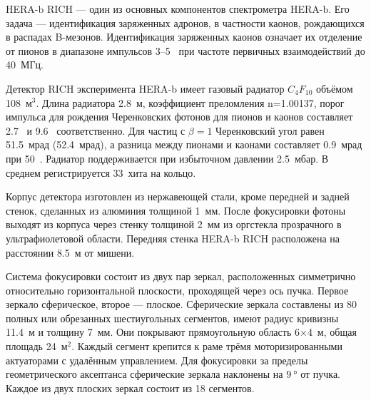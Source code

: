 HERA-b RICH --- один из основных компонентов спектрометра HERA-b. Его задача --- идентификация заряженных адронов, в частности каонов, рождающихся в распадах B-мезонов. Идентификация заряженных каонов означает их отделение от пионов в диапазоне импульсов 3--5~\GeVoverC{} при частоте первичных взаимодействий до 40~МГц.


Детектор RICH эксперимента HERA-b имеет газовый радиатор $C_{4}F_{10}$ объёмом 108~м$^3$. Длина радиатора 2.8~м, коэффициент преломления n=1.00137, порог импульса для рождения Черенковских фотонов для пионов и каонов составляет 2.7~\GeVoverC{} и 9.6~\GeVoverC{} соответственно. Для частиц с $\beta=1$ Черенковский угол равен 51.5~мрад (52.4~мрад), а разница между пионами и каонами составляет 0.9~мрад при 50~\GeVoverC{}. Радиатор поддерживается при избыточном давлении 2.5~мбар. В среднем регистрируется 33~хита на кольцо.


Корпус детектора изготовлен из нержавеющей стали, кроме передней и задней стенок, сделанных из алюминия толщиной 1~мм. После фокусировки фотоны выходят из корпуса через стенку толщиной 2~мм из оргстекла прозрачного в ультрафиолетовой области. Передняя стенка HERA-b RICH расположена на расстоянии 8.5~м от мишени.

Система фокусировки состоит из двух пар зеркал, расположенных симметрично относительно горизонтальной плоскости, проходящей через ось пучка. Первое зеркало сферическое, второе --- плоское. Сферические зеркала составлены из 80 полных или обрезанных шестиугольных сегментов, имеют радиус кривизны 11.4~м и толщину 7~мм. Они покрывают прямоугольную область 6$\times$4~м, общая площадь 24~м$^2$. Каждый сегмент крепится к раме трёмя моторизированными актуаторами с удалённым управлением. Для фокусировки за пределы геометрического аксептанса сферические зеркала наклонены на $\SI{9}{\degree}$ от пучка. Каждое из двух плоских зеркал состоит из 18 сегментов.


